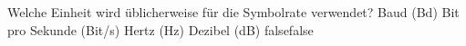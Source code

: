     {Welche Einheit wird üblicherweise für die Symbolrate verwendet?}
    {Baud (Bd)}
    {Bit pro Sekunde (Bit/s)}
    {Hertz (Hz)}
    {Dezibel (dB)}
    {false}{false}